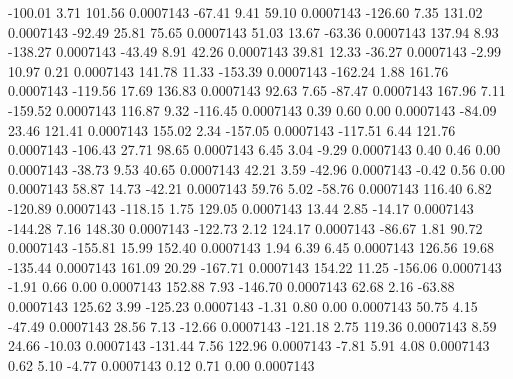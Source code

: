      -100.01        3.71      101.56     0.0007143
      -67.41        9.41       59.10     0.0007143
     -126.60        7.35      131.02     0.0007143
      -92.49       25.81       75.65     0.0007143
       51.03       13.67      -63.36     0.0007143
      137.94        8.93     -138.27     0.0007143
      -43.49        8.91       42.26     0.0007143
       39.81       12.33      -36.27     0.0007143
       -2.99       10.97        0.21     0.0007143
      141.78       11.33     -153.39     0.0007143
     -162.24        1.88      161.76     0.0007143
     -119.56       17.69      136.83     0.0007143
       92.63        7.65      -87.47     0.0007143
      167.96        7.11     -159.52     0.0007143
      116.87        9.32     -116.45     0.0007143
        0.39        0.60        0.00     0.0007143
      -84.09       23.46      121.41     0.0007143
      155.02        2.34     -157.05     0.0007143
     -117.51        6.44      121.76     0.0007143
     -106.43       27.71       98.65     0.0007143
        6.45        3.04       -9.29     0.0007143
        0.40        0.46        0.00     0.0007143
      -38.73        9.53       40.65     0.0007143
       42.21        3.59      -42.96     0.0007143
       -0.42        0.56        0.00     0.0007143
       58.87       14.73      -42.21     0.0007143
       59.76        5.02      -58.76     0.0007143
      116.40        6.82     -120.89     0.0007143
     -118.15        1.75      129.05     0.0007143
       13.44        2.85      -14.17     0.0007143
     -144.28        7.16      148.30     0.0007143
     -122.73        2.12      124.17     0.0007143
      -86.67        1.81       90.72     0.0007143
     -155.81       15.99      152.40     0.0007143
        1.94        6.39        6.45     0.0007143
      126.56       19.68     -135.44     0.0007143
      161.09       20.29     -167.71     0.0007143
      154.22       11.25     -156.06     0.0007143
       -1.91        0.66        0.00     0.0007143
      152.88        7.93     -146.70     0.0007143
       62.68        2.16      -63.88     0.0007143
      125.62        3.99     -125.23     0.0007143
       -1.31        0.80        0.00     0.0007143
       50.75        4.15      -47.49     0.0007143
       28.56        7.13      -12.66     0.0007143
     -121.18        2.75      119.36     0.0007143
        8.59       24.66      -10.03     0.0007143
     -131.44        7.56      122.96     0.0007143
       -7.81        5.91        4.08     0.0007143
        0.62        5.10       -4.77     0.0007143
        0.12        0.71        0.00     0.0007143
